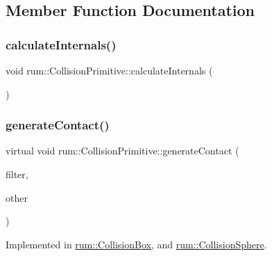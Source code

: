 \subsection{Member Function Documentation}
\mbox{\label{classrum_1_1_collision_primitive_a422c1a39ca224b97e977022b5c781047}} 
\subsubsection{\texorpdfstring{calculate\+Internals()}{calculateInternals()}}
{\footnotesize\ttfamily void rum\+::\+Collision\+Primitive\+::calculate\+Internals (\begin{DoxyParamCaption}{ }\end{DoxyParamCaption})}

\mbox{\label{classrum_1_1_collision_primitive_a31af51e97485378954de219b8411a27d}} 
\subsubsection{\texorpdfstring{generate\+Contact()}{generateContact()}\hspace{0.1cm}{\footnotesize\ttfamily [1/3]}}
{\footnotesize\ttfamily virtual void rum\+::\+Collision\+Primitive\+::generate\+Contact (\begin{DoxyParamCaption}\item[{\mbox{\hyperlink{classrum_1_1_i_narrow_phase_filter}{I\+Narrow\+Phase\+Filter}} $\ast$}]{filter,  }\item[{\mbox{\hyperlink{classrum_1_1_collision_primitive}{Collision\+Primitive}} $\ast$}]{other }\end{DoxyParamCaption})\hspace{0.3cm}{\ttfamily [pure virtual]}}



Implemented in \mbox{\hyperlink{classrum_1_1_collision_box_a3f72c354e24f866be640f0b3f8e2a4b4}{rum\+::\+Collision\+Box}}, and \mbox{\hyperlink{classrum_1_1_collision_sphere_a4101051ee3213ce5257adcabd1529c00}{rum\+::\+Collision\+Sphere}}.

